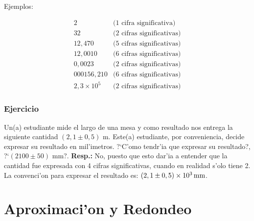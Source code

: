 \documentclass[letterpaper,11pt]{report}
\begin{document}
Ejemplos:

\begin{equation}
\begin{array}{ll}
2 & (1 \text{ cifra significativa)}\\
32 & (2 \text{ cifras significativas)}\\
12,470 & (5 \text{ cifras significativas)}\\
12,0010 &(6 \text{ cifras significativas)}\\
0,0023 & (2 \text{ cifras significativas)}\\
000156,210 & (6 \text{ cifras significativas)}\\
2,3\times 10^5 &(2 \text{ cifras significativas)}
\end{array}
\end{equation}


\subsubsection{Ejercicio}

Un(a) estudiante mide el largo de una mesa y como resultado nos entrega
la siguiente cantidad $(2,1\pm 0,5)$ m. Este(a) estudiante, por
conveniencia, decide expresar su resultado en mil'imetros. ?`C'omo tendr'ia
que expresar su resultado?, ?`$(2100\pm 50)$ mm?. \textbf{Resp.:} No, puesto que esto dar'ia a entender que la cantidad fue expresada con 4 cifras significativas, cuando en realidad s'olo tiene 2. La convenci'on para expresar el resultado es: $(2,1\pm 0,5)\times 10^3\,\rm mm$.

\section{Aproximaci'on y Redondeo}
\end{document}
